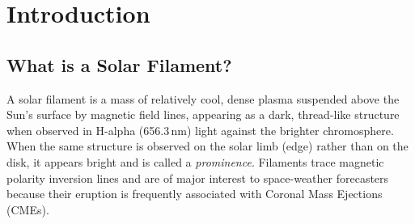 \documentclass[11pt,a4paper,openany]{report}
\begin{document}
\begin{titlepage}
\begin{abstract}
This report documents \textbf{Solaris}, an end-to-end deep learning pipeline implemented in
\texttt{solaris.py} that performs instance segmentation of solar filaments using the YOLOv8l-Seg
architecture, trained and evaluated on the MAGFiLO 1.0 dataset (Kaggle 2026 competition format).
The pipeline is designed to be portable across Kaggle, Google Colab, and local environments,
and covers five major stages:
\begin{enumerate}[label=(\arabic*)]
  \item Environment and path resolution across multiple hosting platforms.
  \item Dataset conversion from COCO-style polygon/RLE annotations into normalized YOLO
        segmentation labels.
  \item Model training of YOLOv8l-Seg at high resolution ($2048\times2048$) with domain-specific augmentation.
  \item Inference at high precision with strict confidence thresholding and duplicate suppression.
  \item Post-processing via priority-based overlap removal and conversion of binary masks into
        Run-Length Encoded (RLE) strings for Kaggle-style submission.
\end{enumerate}
Each function in \texttt{solaris.py} is explained line-by-line, with the underlying mathematics
(Dice score, IoU, mask normalization, RLE encoding) derived explicitly. The report closes with
an evaluation of the pipeline's design choices, its limitations, and directions for future improvement.
\end{abstract}
\end{titlepage}

\tableofcontents

\chapter{Introduction}

\section{What is a Solar Filament?}

A solar filament is a mass of relatively cool, dense plasma suspended above the Sun's surface by
magnetic field lines, appearing as a dark, thread-like structure when observed in H-alpha
(656.3\,nm) light against the brighter chromosphere. When the same structure is observed on
the solar limb (edge) rather than on the disk, it appears bright and is called a \textit{prominence}.
Filaments trace magnetic polarity inversion lines and are of major interest to space-weather
forecasters because their eruption is frequently associated with Coronal Mass Ejections (CMEs).
\end{document}
